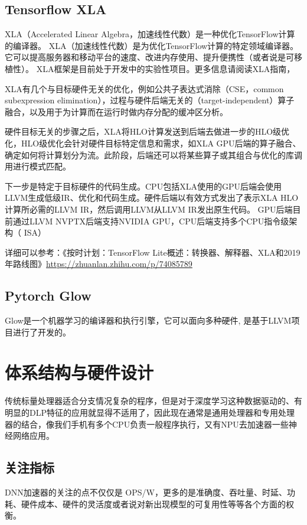 \documentclass[12pt]{article}
\begin{document}
\subsection{Tensorflow XLA}
XLA（Accelerated Linear Algebra，加速线性代数）是一种优化TensorFlow计算的编译器。 XLA（加速线性代数）是为优化TensorFlow计算的特定领域编译器。它可以提高服务器和移动平台的速度、改进内存使用、提升便携性（或者说是可移植性）。 XLA框架是目前处于开发中的实验性项目。更多信息请阅读XLA指南，

XLA有几个与目标硬件无关的优化，例如公共子表达式消除（CSE，common subexpression elimination），过程与硬件后端无关的（target-independent）算子融合，以及用于为计算而在运行时做内存分配的缓冲区分析。

硬件目标无关的步骤之后，XLA将HLO计算发送到后端去做进一步的HLO级优化，HLO级优化会针对硬件目标特定信息和需求，如XLA GPU后端的算子融合、确定如何将计算划分为流。此阶段，后端还可以将某些算子或其组合与优化的库调用进行模式匹配。

下一步是特定于目标硬件的代码生成。CPU包括XLA使用的GPU后端会使用LLVM生成低级IR、优化和代码生成。硬件后端以有效方式发出了表示XLA HLO计算所必需的LLVM IR，然后调用LLVM从LLVM IR发出原生代码。
GPU后端目前通过LLVM NVPTX后端支持NVIDIA GPU，CPU后端支持多个CPU指令级架构（ ISA）

详细可以参考：《按时计划：TensorFlow Lite概述：转换器、解释器、XLA和2019年路线图》\url{https://zhuanlan.zhihu.com/p/74085789}

\subsection{Pytorch Glow}
Glow是一个机器学习的编译器和执行引擎，它可以面向多种硬件, 是基于LLVM项目进行了开发的。

\section{体系结构与硬件设计}
传统标量处理器适合分支情况复杂的程序，但是对于深度学习这种数据驱动的、有明显的DLP特征的应用就显得不适用了，因此现在通常是通用处理器和专用处理器的结合，像我们手机有多个CPU负责一般程序执行，又有NPU去加速器一些神经网络应用。

\subsection{关注指标}
DNN加速器的关注的点不仅仅是 OPS/W，更多的是准确度、吞吐量、时延、功耗、硬件成本、硬件的灵活度或者说对新出现模型的可复用性等等各个方面的权衡。
\end{document}
